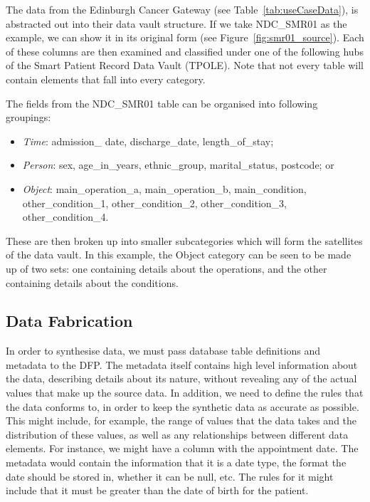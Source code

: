 \noindent
The data from %
the Edinburgh Cancer Gateway %
(see Table~\ref{tab:useCaseData}), is 
abstracted out into their data vault structure. If we take NDC\_SMR01 as the example, we can show it in its original form (see Figure~\ref{fig:smr01_source}). Each of these columns are then examined and classified under one of the following hubs of the Smart Patient Record Data Vault (TPOLE).
Note that not every table will contain elements that fall into every category.

The fields from the NDC\_SMR01 table can be organised into following groupings:
\begin{itemize}
\item \emph{Time}: admission\_ date, discharge\_date, length\_of\_stay;
\item \emph{Person}: sex, age\_in\_years, ethnic\_group, marital\_status, postcode; or
\item \emph{Object}: main\_operation\_a, main\_operation\_b, main\_condition, other\_condition\_1, other\_condition\_2, other\_condition\_3, other\_condition\_4.
\end{itemize}


\noindent These are then broken up into smaller subcategories which will form the satellites of the data vault. In this example, the Object category can be seen to be made up of two sets: one containing details about the operations, and the other containing details about the conditions. %

\subsection{Data Fabrication}
\label{ssec:DataFabrication}

\noindent
In order to synthesise data, we must pass database table definitions and metadata to the %
DFP. The metadata itself contains high level information about the data, describing details about its nature, without revealing any of the actual values that make up the source data. In addition, we need to define the rules that the data conforms to, in order to keep the synthetic data as accurate as possible. This might include, for example, the range of values that the data takes and the distribution of these values, as well as any relationships between different data elements. For instance, we might have a column with the appointment date. The metadata would contain the information that it is a date type, the format the date should be stored in, whether it can be null, etc. The rules for it might include that it must be greater than the date of birth for the patient. %

